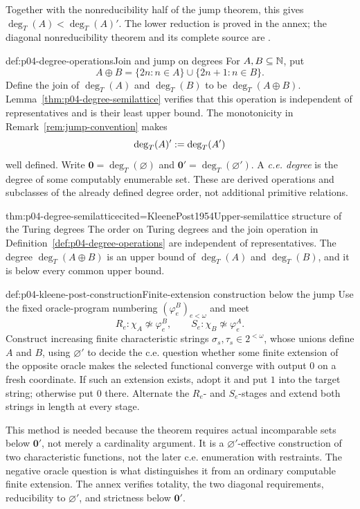 Together with the nonreducibility half of the jump theorem, this gives
\(\deg_T(A)<\deg_T(A)'\).  The lower reduction is proved in the annex; the
diagonal nonreducibility theorem and its complete source are
\cite{KleenePost1954,Rogers1967}.

\begin{hbdefinition}{def:p04-degree-operations}{Join and jump on degrees}
For \(A,B\subseteq\mathbb{N}\), put
\[
 A\oplus B=\{2n:n\in A\}\cup\{2n+1:n\in B\}.
\]
Define the join of \(\deg_T(A)\) and \(\deg_T(B)\) to be
\(\deg_T(A\oplus B)\).  Lemma~\ref{thm:p04-degree-semilattice} verifies that
this operation is independent of representatives and is their least upper
bound.  The monotonicity in
Remark~\ref{rem:jump-convention} makes
\[
 \deg_T(A)'\mathrel{:=}\deg_T(A')
\]
well defined.  Write \(\mathbf0=\deg_T(\varnothing)\) and
\(\mathbf0'=\deg_T(\varnothing')\).  A \emph{c.e. degree} is the degree of
some computably enumerable set.  These are derived operations and subclasses
of the already defined degree order, not additional primitive relations.
\end{hbdefinition}

\begin{hblemma}{thm:p04-degree-semilattice}{cited=KleenePost1954}{Upper-semilattice structure of the Turing degrees}
The order on Turing degrees and the join operation in
Definition~\ref{def:p04-degree-operations} are independent of representatives.
The degree \(\deg_T(A\oplus B)\) is an upper bound of
\(\deg_T(A)\) and \(\deg_T(B)\), and it is below every common upper bound.
\end{hblemma}

\begin{hbmethod}{def:p04-kleene-post-construction}{Finite-extension construction below the jump}
Use the fixed oracle-program numbering \((\varphi_e^B)_{e<\omega}\) and meet
 \[
 R_e:\chi_A\not\simeq\varphi_e^B,
 \qquad
 S_e:\chi_B\not\simeq\varphi_e^A.
\]
Construct increasing finite characteristic strings
\(\sigma_s,\tau_s\in2^{<\omega}\), whose unions define \(A\) and \(B\),
using \(\varnothing'\) to decide the c.e. question
whether some finite extension of the opposite oracle makes the selected
functional converge with output \(0\) on a fresh coordinate.  If such an
extension exists, adopt it and put \(1\) into the target string; otherwise put
\(0\) there.  Alternate the \(R_e\)- and \(S_e\)-stages and extend both
strings in length at every stage.

This method is needed because the theorem requires actual incomparable sets
below \(\mathbf0'\), not merely a cardinality argument.  It is a
\(\varnothing'\)-effective construction of two characteristic functions, not
the later c.e. enumeration with restraints.  The negative oracle question is
what distinguishes it from an ordinary computable finite extension.  The
annex verifies totality, the two diagonal requirements, reducibility to
\(\varnothing'\), and strictness below \(\mathbf0'\).
\end{hbmethod}

